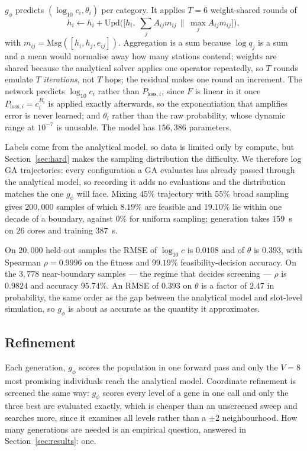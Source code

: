 \documentclass[journal,a4paper,comsoc,twocolumn]{IEEEtran}
\newcommand{\Ploss}[1][]{P_{\mathrm{loss}#1}}
\begin{document}
$g_\phi$ predicts $(\log_{10} c_i, \theta_i)$ per category. It applies $T = 6$
weight-shared rounds of
\begin{equation}
\label{eq:mp}
h_i \leftarrow h_i + \mathrm{Upd}\Big(\big[h_i,\;
  \textstyle\sum_j A_{ij} m_{ij} \,\|\, \max_j A_{ij} m_{ij}\big]\Big),
\end{equation}
with $m_{ij} = \mathrm{Msg}([h_i, h_j, e_{ij}])$. Aggregation is a sum because
$\log q_j$ is a sum and a mean would normalise away how many stations contend;
weights are shared because the analytical solver applies one operator
repeatedly, so $T$ rounds emulate $T$ \emph{iterations}, not $T$ hops; the
residual makes one round an increment. The network predicts $\log_{10} c_i$
rather than $\Ploss[,i]$, since $F$ is linear in it once
$\Ploss[,i] = c_i^{R_i}$ is applied exactly afterwards, so the exponentiation
that amplifies error is never learned; and $\theta_i$ rather than the raw
probability, whose dynamic range at $10^{-7}$ is unusable. The model has
$156{,}386$ parameters.

Labels come from the analytical model, so data is limited only by compute, but
Section~\ref{sec:hard} makes the sampling distribution the difficulty. We
therefore log GA trajectories: every configuration a GA evaluates has already
passed through the analytical model, so recording it adds no evaluations and the
distribution matches the one $g_\phi$ will face. Mixing $45\%$ trajectory with
$55\%$ broad sampling gives $200{,}000$ samples of which $8.19\%$ are feasible
and $19.10\%$ lie within one decade of a boundary, against $0\%$ for uniform
sampling; generation takes $159$~s on $26$ cores and training $387$~s.

On $20{,}000$ held-out samples the RMSE of $\log_{10} c$ is $0.0108$ and of
$\theta$ is $0.393$, with Spearman $\rho = 0.9996$ on the fitness and $99.19\%$
feasibility-decision accuracy. On the $3{,}778$ near-boundary samples --- the
regime that decides screening --- $\rho$ is $0.9824$ and accuracy $95.74\%$. An
RMSE of $0.393$ on $\theta$ is a factor of $2.47$ in probability, the same order
as the gap between the analytical model and slot-level simulation, so $g_\phi$
is about as accurate as the quantity it approximates.

\subsection{Refinement}
\label{sec:refine}

Each generation, $g_\phi$ scores the population in one forward pass and only the
$V = 8$ most promising individuals reach the analytical model. Coordinate
refinement is screened the same way: $g_\phi$ scores every level of a gene in
one call and only the three best are evaluated exactly, which is cheaper than an
unscreened sweep and searches more, since it examines all levels rather than a
$\pm 2$ neighbourhood. How many generations are needed is an empirical question,
answered in Section~\ref{sec:results}: one.
\end{document}
